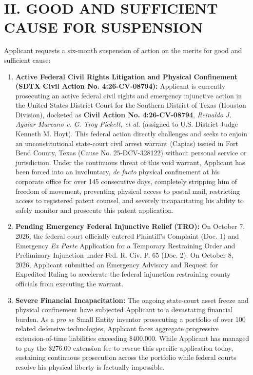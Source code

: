 \documentclass[11pt,letterpaper]{article}
\begin{document}
\section*{II. GOOD AND SUFFICIENT CAUSE FOR SUSPENSION}

Applicant requests a six-month suspension of action on the merits for good and sufficient cause:

\begin{enumerate}[leftmargin=2em, itemsep=4pt, parsep=0pt]
    \item \textbf{Active Federal Civil Rights Litigation and Physical Confinement (SDTX Civil Action No. 4:26-CV-08794):} Applicant is currently prosecuting an active federal civil rights and emergency injunctive action in the United States District Court for the Southern District of Texas (Houston Division), docketed as \textbf{Civil Action No. 4:26-CV-08794}, \textit{Reinaldo J. Aguiar Marcano v. G. Troy Pickett, et al.} (assigned to U.S. District Judge Kenneth M. Hoyt). This federal action directly challenges and seeks to enjoin an unconstitutional state-court civil arrest warrant (Capias) issued in Fort Bend County, Texas (Cause No. 25-DCV-328122) without personal service or jurisdiction. Under the continuous threat of this void warrant, Applicant has been forced into an involuntary, \textit{de facto} physical confinement at his corporate office for over 145 consecutive days, completely stripping him of freedom of movement, preventing physical access to postal mail, restricting access to registered patent counsel, and severely incapacitating his ability to safely monitor and prosecute this patent application.
    \item \textbf{Pending Emergency Federal Injunctive Relief (TRO):} On October 7, 2026, the federal court officially entered Plaintiff's Complaint (Doc. 1) and Emergency \textit{Ex Parte} Application for a Temporary Restraining Order and Preliminary Injunction under Fed. R. Civ. P. 65 (Doc. 2). On October 8, 2026, Applicant submitted an Emergency Advisory and Request for Expedited Ruling to accelerate the federal injunction restraining county officials from executing the warrant.
    \item \textbf{Severe Financial Incapacitation:} The ongoing state-court asset freeze and physical confinement have subjected Applicant to a devastating financial burden. As a \textit{pro se} Small Entity inventor prosecuting a portfolio of over 100 related defensive technologies, Applicant faces aggregate progressive extension-of-time liabilities exceeding \$400,000. While Applicant has managed to pay the \$276.00 extension fee to rescue this specific application today, sustaining continuous prosecution across the portfolio while federal courts resolve his physical liberty is factually impossible.
\end{enumerate}
\end{document}

